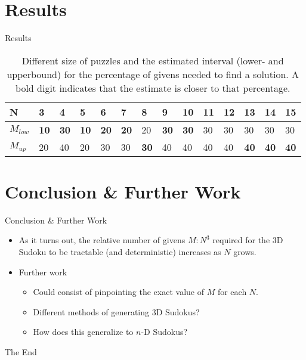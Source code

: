 \documentclass{beamer}
\begin{document}
\section{Results}
\begin{frame}{Results}
    \begin{table}[]
\centering
\begin{tabular}{@{}l|lllllllllllll@{}}
\toprule
N & 3  & 4  & 5  & 6  & 7  & 8  & 9  & 10 & 11 & 12 & 13 & 14 & 15 \\ \midrule
$M_{low}$                      & \textbf{10} & \textbf{30} & \textbf{10} & \textbf{20} & \textbf{20} & 20 & \textbf{30} & \textbf{30} & 30 & 30 & 30 & 30 & 30 \\
$M_{up}$                       & 20 & 40 & 20 & 30 & 30 & \textbf{30} & 40 & 40 & 40 & 40 & \textbf{40} & \textbf{40} & \textbf{40}  
\end{tabular}
\caption{Different size of puzzles and the estimated interval (lower- and upperbound) for the percentage of givens needed to find a solution. A bold digit indicates that the estimate is closer to that percentage.}
\label{tab_res_sum}
\end{table}
\end{frame}

\section{Conclusion \& Further Work}
\begin{frame}{Conclusion \& Further Work}
\begin{itemize}
    \item As it turns out, the relative number of givens $M : N^3$ required for the 3D Sudoku to be tractable (and deterministic) increases as $N$ grows.
    \item Further work
        \begin{itemize}
            \item Could consist of pinpointing the exact value of $M$ for each $N$.
            \item Different methods of generating 3D Sudokus?
            \item How does this generalize to $n$-D Sudokus?
        \end{itemize}
\end{itemize}
\end{frame}



\begin{frame}
\Huge{\centerline{The End}}
\end{frame}

\end{document}
